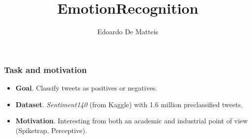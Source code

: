 \documentclass{beamer}
\title{EmotionRecognition}
\author{Edoardo De Matteis}
\institute[Sapienza Università di Roma Computer Science]
\begin{document}
\frame{\titlepage}

\begin{frame}
    \frametitle{Task and motivation}
    \begin{itemize}
        \item \textbf{Goal}. Classify tweets as positives or negatives.
        \item \textbf{Dataset}. \emph{Sentiment140} (from Kaggle) with 1.6 million preclassified tweets.
        \item \textbf{Motivation}. Interesting from both an academic and industrial point of view (Spiketrap, Perceptive).
    \end{itemize}
\end{frame}
\end{document}

